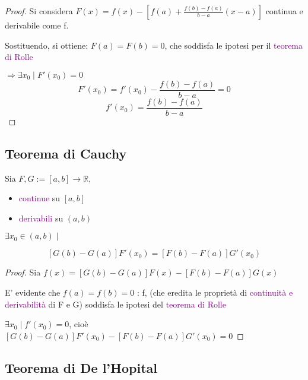 \documentclass{article}
\begin{document}
\begin{proof}
    Si considera $F(x) = f(x) - \left[ f(a) + \frac{f(b) - f(a)}{b -a}(x-a)\right] $ continua e derivabile come f. 

    Sostituendo, si ottiene: $F(a) =F(b)=0$, che soddisfa le ipotesi per il \textcolor{purple}{teorema di Rolle}

$\Rightarrow \exists x_0 \mid F'(x_0) =0$
\[F'(x_0)= f'(x_0) - \frac{f(b) - f(a)}{b -a} = 0 \]
\[f'(x_0) = \frac{f(b) - f(a)}{b -a} \]

\end{proof}

\subsection{Teorema di Cauchy }


 \begin{tcolorbox}[colback= red!15!yellow!5!white, colframe=red]

Sia $F,G:= [a,b] \to \mathbb{R} $, 
\begin{itemize}
    \item \textcolor{purple}{continue} su $[a,b]$
    \item \textcolor{purple}{derivabili} su $(a,b)$
\end{itemize}
$\exists x_0 \in (a, b) \mid $

\[ [G(b)-G(a)] F'(x_0) = [F(b)-F(a)]G'(x_0)\]
\end{tcolorbox}

\begin{proof}
    Sia $f(x) = [G(b)-G(a)] F(x) - [F(b)-F(a)]G(x)$

    E' evidente che $f(a) = f(b) = 0$ : f, (che eredita le proprietà di \textcolor{purple}{continuità  e derivabilità } di F e G) soddisfa le ipotesi del \textcolor{purple}{teorema di Rolle}

    $\exists x_0 \mid f'(x_0) = 0$, cioè $[G(b)-G(a)] F'(x_0) - [F(b)-F(a)]G'(x_0) = 0$   


    
    
\end{proof}

\subsection{Teorema di De l'Hopital}
\end{document}
